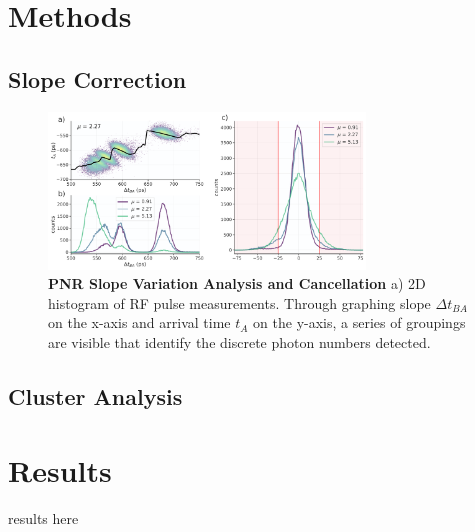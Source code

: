 \documentclass{optica-article}
\begin{document}
\hypertarget{methods}{%
\section{Methods}\label{methods}}

\hypertarget{slope-correction}{%
\subsection{Slope Correction}\label{slope-correction}}

\hypertarget{fig:slope-correction}{%
\begin{figure}
\centering
\includegraphics[width=0.75\textwidth]{./figs_03/slope_cancellation_light.pdf}
\caption[{PNR Slope Variation Analysis and Cancellation}]{\textbf{PNR Slope Variation Analysis and Cancellation} a) 2D histogram of RF pulse measurements. Through graphing slope $\Delta t_{BA}$ on the x-axis and arrival time $t_A$ on the y-axis, a series of groupings are visible that identify the discrete photon numbers detected.}
\label{fig:slope-correction}
\end{figure}
}

\hypertarget{cluster-analysis}{%
\subsection{Cluster Analysis}\label{cluster-analysis}}

\hypertarget{results}{%
\section{Results}\label{results}}

results here


\end{document}
